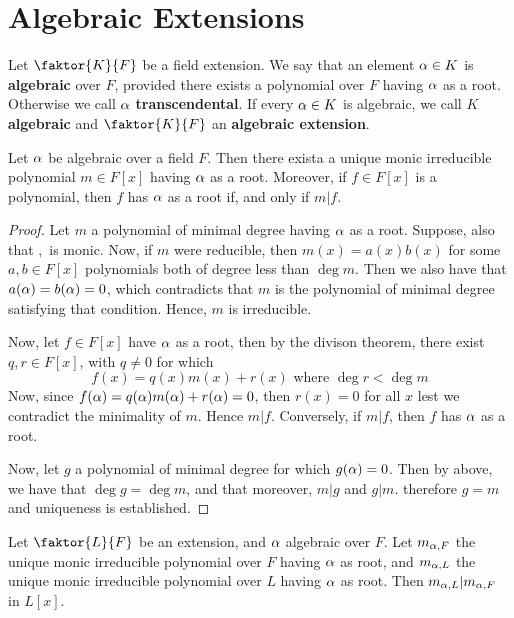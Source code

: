 \section{Algebraic Extensions}
\label{section_8.2}

\begin{definition}
  Let $\faktor{K}{F}$ be a field extension. We say that an element $\alpha \in K$
  is  \textbf{algebraic} over $F$, provided there exists a polynomial over $F$
  having $\alpha$ as a root. Otherwise we call $\alpha$  \textbf{transcendental}. If
  every $\alpha \in K$ is algebraic, we call $K$ \textbf{algebraic} and
  $\faktor{K}{F}$ an \textbf{algebraic extension}.
\end{definition}

\begin{lemma}\label{lemma_8.2.1}
  Let $\alpha$ be algebraic over a field  $F$. Then there exista a unique monic
  irreducible polynomial  $m \in F[x]$ having $\alpha$ as a root. Moreover, if  $f
  \in F[x]$ is a polynomial, then $f$ has $\alpha$ as a root if, and only if $m|f$.
\end{lemma}
\begin{proof}
  Let $m$ a polynomial of minimal degree having  $\alpha$ as a root. Suppose, also
  that  $,$ is monic. Now, if  $m$ were reducible, then $m(x)=a(x)b(x)$ for
  some $a,b \in F[x]$ polynomials both of degree less than $\deg{m}$. Then we
  also have that $a(\alpha)=b(\alpha)=0$, which contradicts that $m$ is the polynomial
  of minimal degree satisfying that condition. Hence,  $m$ is irreducible.

  Now, let  $f \in F[x]$ have $\alpha$ as a root, then by the divison theorem,
  there exist  $q,r \in F[x]$, with $q \neq 0$ for which
  \begin{equation*}
    f(x)=q(x)m(x)+r(x) \text{ where } \deg{r}<\deg{m}
  \end{equation*}
  Now, since $f(\alpha)=q(\alpha)m(\alpha)+r(\alpha)=0$, then $r(x)=0$ for all $x$ lest we
  contradict the minimality of $m$. Hence $m|f$. Conversely, if $m|f$, then
  $f$ has $\alpha$ as a root.

  Now, let $g$ a polynomial of minimal degree for which  $g(\alpha)=0$. Then by
  above, we have that $\deg{g}=\deg{m}$, and that moreover, $m|g$ and  $g|m$.
  therefore  $g=m$ and uniqueness is established.
\end{proof}
\begin{corollary}
  Let $\faktor{L}{F}$ be an extension, and $\alpha$ algebraic over $F$. Let
  $m_{\alpha,F}$ the unique monic irreducible polynomial over $F$ having  $\alpha$ as
  root, and  $m_{\alpha,L}$ the unique monic irreducible polynomial over $L$
  having  $\alpha$ as root. Then $m_{\alpha,L}|m_{\alpha,F}$ in $L[x]$.
\end{corollary}

